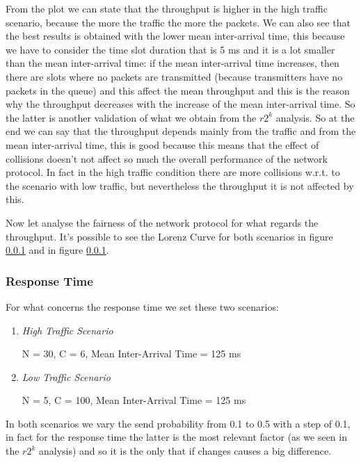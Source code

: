 \noindent From the plot we can state that the throughput is higher in the high traffic scenario, because the more the traffic the more the packets. We can also see that the best results is obtained with the lower mean inter-arrival time, this because we have to consider the time slot duration that is 5 ms and it is a lot smaller than the mean inter-arrival time: if the mean inter-arrival time increases, then there are slots where no packets are transmitted (because transmitters have no packets in the queue) and this affect the mean throughput and this is the reason why the throughput decreases with the increase of the mean inter-arrival time. So the latter is another validation of what we obtain from the $r2^k$ analysis. So at the end we can say that the throughput depends mainly from the traffic and from the mean inter-arrival time, this is good because this means that the effect of collisions doesn't not affect so much the overall performance of the network protocol. In fact in the high traffic condition there are more collisions w.r.t. to the scenario with low traffic, but nevertheless the throughput it is not affected by this.

\noindent Now let analyse the fairness of the network protocol for what regards the throughput. It's possible to see the Lorenz Curve for both scenarios in figure \ref{} and in figure \ref{}.

\subsubsection{Response Time}
For what concerns the response time we set these two scenarios:
\begin{enumerate}
	\item \textit{High Traffic Scenario}
	
	N = 30, C = 6, Mean Inter-Arrival Time = 125 ms
	\item \textit{Low Traffic Scenario}
	
	N = 5, C = 100, Mean Inter-Arrival Time = 125 ms
\end{enumerate}

\noindent In both scenarios we vary the send probability from 0.1 to 0.5 with a step of 0.1, in fact for the response time the latter is the most relevant factor (as we seen in the $r2^k$ analysis) and so it is the only that if changes causes a big difference.

